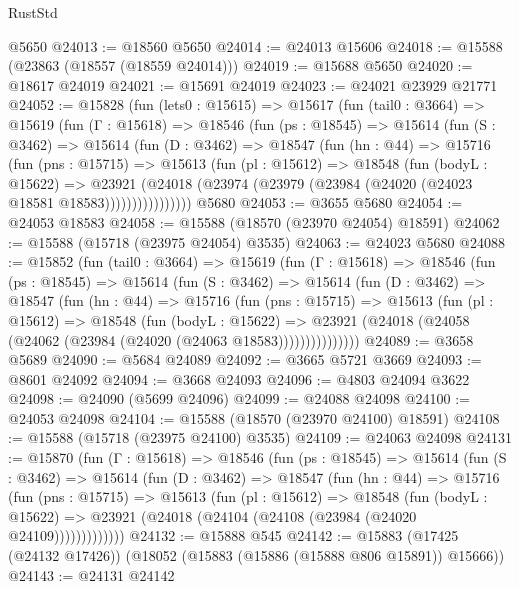 \begin{lexlean}{RustStd}
\begin{coremodule}
    @5650
@24013 := @18560 @5650
@24014 := @24013 @15606
@24018 := @15588 (@23863 (@18557 (@18559 @24014)))
@24019 := @15688 @5650
@24020 := @18617 @24019
@24021 := @15691 @24019
@24023 := @24021 @23929 @21771
@24052 := @15828
    (fun (lets0 : @15615) =>
    @15617
      (fun (tail0 : @3664) =>
      @15619
        (fun (Γ : @15618) =>
        @18546
          (fun (ps : @18545) =>
          @15614
            (fun (S : @3462) =>
            @15614
              (fun (D : @3462) =>
              @18547
                (fun (hn : @44) =>
                @15716
                  (fun (pns : @15715) =>
                  @15613
                    (fun (pl : @15612) =>
                    @18548
                      (fun (bodyL : @15622) =>
                      @23921
                        (@24018
                          (@23974 (@23979 (@23984 (@24020 (@24023 @18581 @18583))))))))))))))))
    @5680
@24053 := @3655 @5680
@24054 := @24053 @18583
@24058 := @15588 (@18570 (@23970 @24054) @18591)
@24062 := @15588 (@15718 (@23975 @24054) @3535)
@24063 := @24023 @5680
@24088 := @15852
    (fun (tail0 : @3664) =>
    @15619
      (fun (Γ : @15618) =>
      @18546
        (fun (ps : @18545) =>
        @15614
          (fun (S : @3462) =>
          @15614
            (fun (D : @3462) =>
            @18547
              (fun (hn : @44) =>
              @15716
                (fun (pns : @15715) =>
                @15613
                  (fun (pl : @15612) =>
                  @18548
                    (fun (bodyL : @15622) =>
                    @23921 (@24018 (@24058 (@24062 (@23984 (@24020 (@24063 @18583)))))))))))))))
@24089 := @3658 @5689
@24090 := @5684 @24089
@24092 := @3665 @5721 @3669
@24093 := @8601 @24092
@24094 := @3668 @24093
@24096 := @4803 @24094 @3622
@24098 := @24090 (@5699 @24096)
@24099 := @24088 @24098
@24100 := @24053 @24098
@24104 := @15588 (@18570 (@23970 @24100) @18591)
@24108 := @15588 (@15718 (@23975 @24100) @3535)
@24109 := @24063 @24098
@24131 := @15870
    (fun (Γ : @15618) =>
    @18546
      (fun (ps : @18545) =>
      @15614
        (fun (S : @3462) =>
        @15614
          (fun (D : @3462) =>
          @18547
            (fun (hn : @44) =>
            @15716
              (fun (pns : @15715) =>
              @15613
                (fun (pl : @15612) =>
                @18548
                  (fun (bodyL : @15622) =>
                  @23921 (@24018 (@24104 (@24108 (@23984 (@24020 @24109)))))))))))))
@24132 := @15888 @545
@24142 := @15883 (@17425 (@24132 @17426)) (@18052 (@15883 (@15886 (@15888 @806 @15891)) @15666))
@24143 := @24131 @24142

\end{coremodule}
\end{lexlean}
